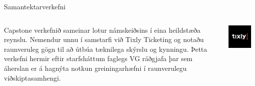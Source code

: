\documentclass[
    NAME={Dr. Helga Ingimundardóttir},
    EMAIL={helgaingim@hi.is},
    FACULTY={Iðnaðarverkfræði},
    TITLE={Hagnýt hæfni í brennidepli},
    SUBTITLE={Endurskoðun á námskeiði í Viðskiptagreind},
    SEMINAR={Ráðstefna kennsluakademíunnar},
    DATE={22 nóvember, 2024},
    WIDE={true},
    ICELANDIC={true}
]{HI-LaTeX/hi-beamer}
\begin{document}
\begin{frame}{Samantektarverkefni}
    \begin{columns}
        \begin{column}{0.7\textwidth}
            Capstone verkefnið sameinar lotur námskeiðsins í eina heildstæða reynslu.
            Nemendur unnu í samstarfi við \alert{Tixly Ticketing} og notaðu raunveruleg gögn til að útbúa tæknilega skýrslu og kynningu.
            \newline\newline
            Þetta verkefni hermir eftir starfsháttum faglegs VG ráðgjafa þar sem áherslan er á hagnýta notkun greiningarhæfni í raunverulegu viðskiptasamhengi.
        \end{column}
        \begin{column}{0.3\textwidth}
            \includegraphics[width=\linewidth]{figures/company}
        \end{column}
    \end{columns}
\end{frame}
\end{document}
